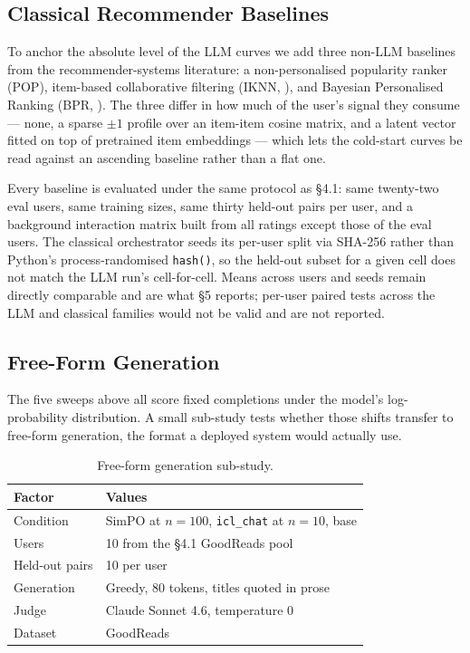 \subsection{Classical Recommender Baselines}
\label{sec:exp:classical}

To anchor the absolute level of the LLM curves we add three non-LLM baselines from the recommender-systems literature: a non-personalised popularity ranker (POP), item-based collaborative filtering (IKNN, \citep{sarwar2001itemcf}), and Bayesian Personalised Ranking (BPR, \citep{rendle2009bpr}). The three differ in how much of the user's signal they consume --- none, a sparse $\pm 1$ profile over an item-item cosine matrix, and a latent vector fitted on top of pretrained item embeddings --- which lets the cold-start curves be read against an ascending baseline rather than a flat one.

Every baseline is evaluated under the same protocol as \S4.1: same twenty-two eval users, same training sizes, same thirty held-out pairs per user, and a background interaction matrix built from all ratings except those of the eval users. The classical orchestrator seeds its per-user split via SHA-256 rather than Python's process-randomised \texttt{hash()}, so the held-out subset for a given cell does not match the LLM run's cell-for-cell. Means across users and seeds remain directly comparable and are what \S5 reports; per-user paired tests across the LLM and classical families would not be valid and are not reported.


\subsection{Free-Form Generation}
\label{sec:exp:freeform}

The five sweeps above all score fixed completions under the model's log-probability distribution. A small sub-study tests whether those shifts transfer to free-form generation, the format a deployed system would actually use.

\begin{table}[h]
\centering
\caption{Free-form generation sub-study.}
\label{tab:freeform_grid}
\begin{tabular}{ll}
\toprule
\textbf{Factor} & \textbf{Values} \\
\midrule
Condition      & SimPO at $n = 100$, \texttt{icl\_chat} at $n = 10$, base \\
Users          & 10 from the \S4.1 GoodReads pool \\
Held-out pairs & 10 per user \\
Generation     & Greedy, 80 tokens, titles quoted in prose \\
Judge          & Claude Sonnet 4.6, temperature 0 \\
Dataset        & GoodReads \\
\bottomrule
\end{tabular}
\end{table}

